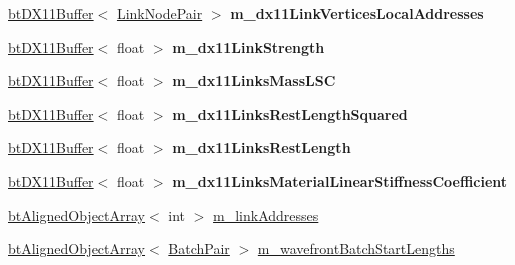 \begin{DoxyCompactItemize}
\item 
\mbox{\label{classbtSoftBodyLinkDataDX11SIMDAware_ae98413386ee30b13a00b605be18c8b05}} 
\hyperlink{classbtDX11Buffer}{bt\+D\+X11\+Buffer}$<$ \hyperlink{classbtSoftBodyLinkData_1_1LinkNodePair}{Link\+Node\+Pair} $>$ {\bfseries m\+\_\+dx11\+Link\+Vertices\+Local\+Addresses}
\item 
\mbox{\label{classbtSoftBodyLinkDataDX11SIMDAware_a3bf4cc049f6f726e0aadbf6ce4d1bb65}} 
\hyperlink{classbtDX11Buffer}{bt\+D\+X11\+Buffer}$<$ float $>$ {\bfseries m\+\_\+dx11\+Link\+Strength}
\item 
\mbox{\label{classbtSoftBodyLinkDataDX11SIMDAware_a6e53e3b42483f2131eb3ca3f4cceb023}} 
\hyperlink{classbtDX11Buffer}{bt\+D\+X11\+Buffer}$<$ float $>$ {\bfseries m\+\_\+dx11\+Links\+Mass\+L\+SC}
\item 
\mbox{\label{classbtSoftBodyLinkDataDX11SIMDAware_ac9663496fff51898beea5acb4e018e1f}} 
\hyperlink{classbtDX11Buffer}{bt\+D\+X11\+Buffer}$<$ float $>$ {\bfseries m\+\_\+dx11\+Links\+Rest\+Length\+Squared}
\item 
\mbox{\label{classbtSoftBodyLinkDataDX11SIMDAware_a2dda5d831438bc0c77aa03483452dcd0}} 
\hyperlink{classbtDX11Buffer}{bt\+D\+X11\+Buffer}$<$ float $>$ {\bfseries m\+\_\+dx11\+Links\+Rest\+Length}
\item 
\mbox{\label{classbtSoftBodyLinkDataDX11SIMDAware_a6c7e4a58286f810722fc7cac0cf0b8e9}} 
\hyperlink{classbtDX11Buffer}{bt\+D\+X11\+Buffer}$<$ float $>$ {\bfseries m\+\_\+dx11\+Links\+Material\+Linear\+Stiffness\+Coefficient}
\item 
\hyperlink{classbtAlignedObjectArray}{bt\+Aligned\+Object\+Array}$<$ int $>$ \hyperlink{classbtSoftBodyLinkDataDX11SIMDAware_ac778fd415c477feba8efe6233d62d22a}{m\+\_\+link\+Addresses}
\item 
\hyperlink{classbtAlignedObjectArray}{bt\+Aligned\+Object\+Array}$<$ \hyperlink{structbtSoftBodyLinkDataDX11SIMDAware_1_1BatchPair}{Batch\+Pair} $>$ \hyperlink{classbtSoftBodyLinkDataDX11SIMDAware_a6d72393afb85fed7bde853ce6e1fcc16}{m\+\_\+wavefront\+Batch\+Start\+Lengths}
\end{DoxyCompactItemize}
